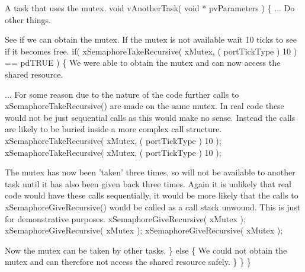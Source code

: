 \begin{DoxyPre}A task that uses the mutex.
 void vAnotherTask( void * pvParameters )
 \{
... Do other things.
\begin{DoxyVerb}if( xMutex != NULL )
{
\end{DoxyVerb}

See if we can obtain the mutex.  If the mutex is not available
wait 10 ticks to see if it becomes free.        
        if( xSemaphoreTakeRecursive( xMutex, ( portTickType ) 10 ) == pdTRUE )
        \{
We were able to obtain the mutex and can now access the
shared resource.\end{DoxyPre}



\begin{DoxyPre}...
For some reason due to the nature of the code further calls to 
xSemaphoreTakeRecursive() are made on the same mutex.  In real
code these would not be just sequential calls as this would make
no sense.  Instead the calls are likely to be buried inside
a more complex call structure.
            xSemaphoreTakeRecursive( xMutex, ( portTickType ) 10 );
            xSemaphoreTakeRecursive( xMutex, ( portTickType ) 10 );\end{DoxyPre}



\begin{DoxyPre}The mutex has now been 'taken' three times, so will not be 
available to another task until it has also been given back
three times.  Again it is unlikely that real code would have
these calls sequentially, it would be more likely that the calls
to xSemaphoreGiveRecursive() would be called as a call stack
unwound.  This is just for demonstrative purposes.
            xSemaphoreGiveRecursive( xMutex );
                        xSemaphoreGiveRecursive( xMutex );
                        xSemaphoreGiveRecursive( xMutex );\end{DoxyPre}



\begin{DoxyPre}Now the mutex can be taken by other tasks.
        \}
        else
        \{
We could not obtain the mutex and can therefore not access
the shared resource safely.
        \}
    \}
 \}
 \end{DoxyPre}
 